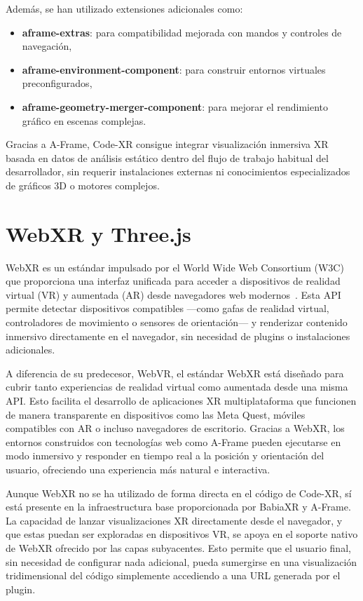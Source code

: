 \documentclass[a4paper, 12pt]{book}
\begin{document}
Además, se han utilizado extensiones adicionales como:

\begin{itemize}
    \item \textbf{aframe-extras}: para compatibilidad mejorada con mandos y controles de navegación,
    \item \textbf{aframe-environment-component}: para construir entornos virtuales preconfigurados,
    \item \textbf{aframe-geometry-merger-component}: para mejorar el rendimiento gráfico en escenas complejas.
\end{itemize}

Gracias a A-Frame, Code-XR consigue integrar visualización inmersiva XR basada en datos de análisis estático dentro del flujo de trabajo habitual del desarrollador, sin requerir instalaciones externas ni conocimientos especializados de gráficos 3D o motores complejos.


\section{WebXR y Three.js}
\label{sec:webxr-threejs}

WebXR es un estándar impulsado por el World Wide Web Consortium (W3C) que proporciona una interfaz unificada para acceder a dispositivos de realidad virtual (VR) y aumentada (AR) desde navegadores web modernos~\cite{webxr}. Esta API permite detectar dispositivos compatibles —como gafas de realidad virtual, controladores de movimiento o sensores de orientación— y renderizar contenido inmersivo directamente en el navegador, sin necesidad de plugins o instalaciones adicionales.

A diferencia de su predecesor, WebVR, el estándar WebXR está diseñado para cubrir tanto experiencias de realidad virtual como aumentada desde una misma API. Esto facilita el desarrollo de aplicaciones XR multiplataforma que funcionen de manera transparente en dispositivos como las Meta Quest, móviles compatibles con AR o incluso navegadores de escritorio. Gracias a WebXR, los entornos construidos con tecnologías web como A-Frame pueden ejecutarse en modo inmersivo y responder en tiempo real a la posición y orientación del usuario, ofreciendo una experiencia más natural e interactiva.

Aunque WebXR no se ha utilizado de forma directa en el código de Code-XR, sí está presente en la infraestructura base proporcionada por BabiaXR y A-Frame. La capacidad de lanzar visualizaciones XR directamente desde el navegador, y que estas puedan ser exploradas en dispositivos VR, se apoya en el soporte nativo de WebXR ofrecido por las capas subyacentes. Esto permite que el usuario final, sin necesidad de configurar nada adicional, pueda sumergirse en una visualización tridimensional del código simplemente accediendo a una URL generada por el plugin.
\end{document}
